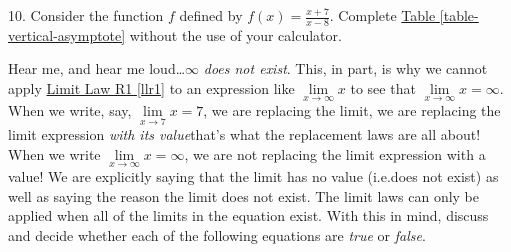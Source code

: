 \documentclass[12pt,]{book}
\theoremstyle{plain}
\theoremstyle{definition}
\numberwithin{equation}{section}
\newcommand{\hrulemedium}{\noalign{\hrule height 0.07em}}
\newcommand{\hrulethick} {\noalign{\hrule height 0.11em}}
\newcounter{figstack}
\newcounter{figindex}
\newlength\fight
\newcommand\pushValignCaptionBottom[5][b]{%
\stepcounter{figstack}%
\expandafter\def\csname %
figalign\romannumeral\value{figstack}\endcsname{#1}%
\expandafter\def\csname %
figtype\romannumeral\value{figstack}\endcsname{#2}%
\expandafter\def\csname %
figwd\romannumeral\value{figstack}\endcsname{#3}%
\expandafter\def\csname %
figcontent\romannumeral\value{figstack}\endcsname{#4}%
\expandafter\def\csname %
figcap\romannumeral\value{figstack}\endcsname{#5}%
\setbox0=\hbox{%
\begin{#2}{#3}#4\end{#2}}%
\ifdim\dimexpr\ht0+\dp0\relax>\fight\global\setlength{\fight}{%
\dimexpr\ht0+\dp0\relax}\fi%
}
\newcommand\popValignCaptionBottom{%
\setcounter{figindex}{0}%
\hfill%
\whiledo{\value{figindex}<\value{figstack}}{%
\stepcounter{figindex}%
\def\tmp{\csname figwd\romannumeral\value{figindex}\endcsname}%
\begin{\csname figtype\romannumeral\value{figindex}\endcsname}[t]{\tmp}%
\centering%
\stackinset{c}{}%
{\csname figalign\romannumeral\value{figindex}\endcsname}{}%
{\csname figcontent\romannumeral\value{figindex}\endcsname}%
{\rule{0pt}{\fight}}\par%
\csname figcap\romannumeral\value{figindex}\endcsname%
\end{\csname figtype\romannumeral\value{figindex}\endcsname}%
\hfill%
}%
\setcounter{figstack}{0}%
\setlength{\fight}{0pt}%
\hfill%
}
\newcommand{\fe}[2]{#1\mathopen{}\left(#2\right)\mathclose{}}
\begin{document}
\begin{exerciselist}
\item[10.]\hypertarget{exercise-99}{\null}Consider the function \(f\) defined by \(\fe{f}{x}=\frac{x+7}{x-8}\). Complete \hyperref[table-vertical-asymptote]{Table \ref{table-vertical-asymptote}} without the use of your calculator.%
\par\smallskip
Hear me, and hear me loud\dots{}\(\infty\) \emph{does not exist}. This, in part, is why we cannot apply \hyperref[llr1]{Limit Law R1 \ref{llr1}} to an expression like \(\lim\limits_{x\to\infty}x\) to see that \(\lim\limits_{x\to\infty}x=\infty\). When we write, say, \(\lim\limits_{x\to7}x=7\), we are replacing the limit, we are replacing the limit expression \emph{with its value}\textemdash{}that's what the replacement laws are all about! When we write \(\lim\limits_{x\to\infty}x=\infty\), we are not replacing the limit expression with a value! We are explicitly saying that the limit has no value (i.e.\@ does not exist) as well as saying the reason the limit does not exist. The limit laws can only be applied when all of the limits in the equation exist. With this in mind, discuss and decide whether each of the following equations are \emph{true} or \emph{false}.%

\end{exerciselist}
\end{document}
